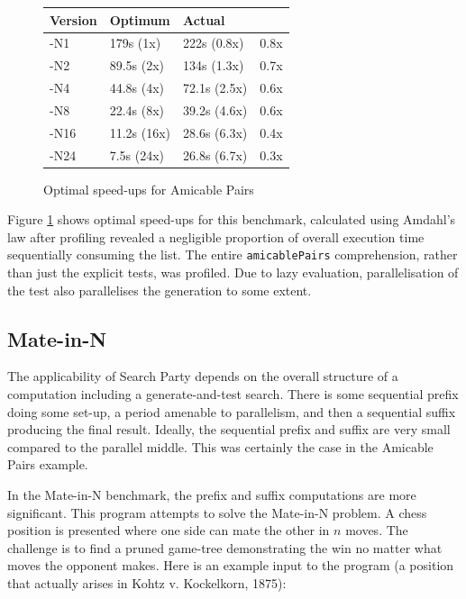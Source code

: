 \begin{figure}[t]
  \centering
  \begin{tabularx}{\linewidth}{|X|X|X|X|}
    \hline \textbf{Version} & \textbf{Optimum} & \textbf{Actual} & \\
    \hline -N1  & 179s (1x)   & 222s (0.8x)  & 0.8x \\
           -N2  & 89.5s (2x)  & 134s (1.3x)  & 0.7x \\
           -N4  & 44.8s (4x)  & 72.1s (2.5x) & 0.6x \\
           -N8  & 22.4s (8x)  & 39.2s (4.6x) & 0.6x \\
           -N16 & 11.2s (16x) & 28.6s (6.3x) & 0.4x \\
           -N24 & 7.5s  (24x) & 26.8s (6.7x) & 0.3x \\
    \hline
  \end{tabularx}
  \caption{Optimal speed-ups for Amicable Pairs}
  \label{fig:examples-amis-amdahl}
\end{figure}

Figure \ref{fig:examples-amis-amdahl} shows optimal speed-ups for this
benchmark, calculated using Amdahl's law after profiling revealed a
negligible proportion of overall execution time sequentially consuming
the list. The entire \verb|amicablePairs| comprehension, rather than
just the explicit tests, was profiled. Due to lazy evaluation,
parallelisation of the test also parallelises the generation to some
extent.

\subsection*{Mate-in-N}
\label{sec:prelims-searchparty-examples-mate}

The applicability of Search Party depends on the overall structure of
a computation including a generate-and-test search. There is some
sequential prefix doing some set-up, a period amenable to parallelism,
and then a sequential suffix producing the final result. Ideally, the
sequential prefix and suffix are very small compared to the parallel
middle. This was certainly the case in the Amicable Pairs example.

In the Mate-in-N benchmark, the prefix and suffix computations are
more significant. This program attempts to solve the Mate-in-N
problem. A chess position is presented where one side can mate the
other in $n$ moves. The challenge is to find a pruned game-tree
demonstrating the win no matter what moves the opponent makes. Here is
an example input to the program (a position that actually arises in
Kohtz v. Kockelkorn, 1875):

